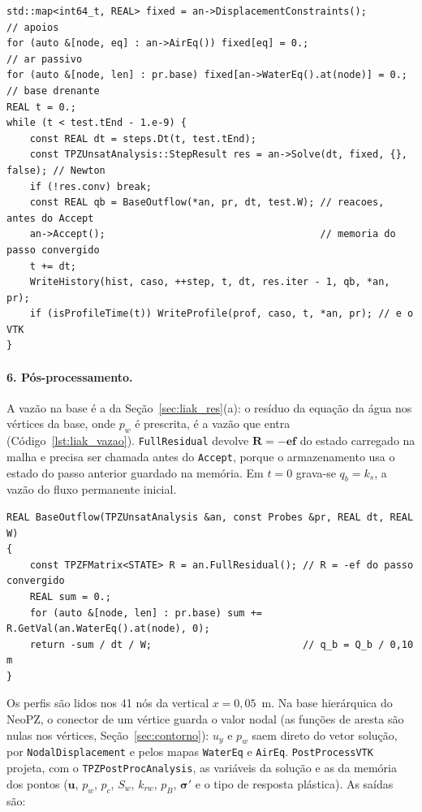 \documentclass[11pt,a4paper]{article}
\newcommand{\vu}{\bm u}
\newcommand{\tsig}{\bm\sigma}
\begin{document}
\begin{lstlisting}[style=neopz,caption={Contorno do transiente e laço no tempo (\texttt{RunCase}, simplificado).},
                   label={lst:liak_passo}]
std::map<int64_t, REAL> fixed = an->DisplacementConstraints();       // apoios
for (auto &[node, eq] : an->AirEq()) fixed[eq] = 0.;                   // ar passivo
for (auto &[node, len] : pr.base) fixed[an->WaterEq().at(node)] = 0.;  // base drenante
REAL t = 0.;
while (t < test.tEnd - 1.e-9) {
    const REAL dt = steps.Dt(t, test.tEnd);
    const TPZUnsatAnalysis::StepResult res = an->Solve(dt, fixed, {}, false); // Newton
    if (!res.conv) break;
    const REAL qb = BaseOutflow(*an, pr, dt, test.W); // reacoes, antes do Accept
    an->Accept();                                     // memoria do passo convergido
    t += dt;
    WriteHistory(hist, caso, ++step, t, dt, res.iter - 1, qb, *an, pr);
    if (isProfileTime(t)) WriteProfile(prof, caso, t, *an, pr); // e o VTK
}
\end{lstlisting}

\paragraph{6. Pós-processamento.} A vazão na base é a da Seção~\ref{sec:liak_res}(a): o resíduo
da equação da água nos vértices da base, onde $p_w$ é prescrita, é a vazão que entra
(Código~\ref{lst:liak_vazao}). \texttt{FullResidual} devolve $\mathbf R=-\mathbf{ef}$ do estado
carregado na malha e precisa ser chamada antes do \texttt{Accept}, porque o armazenamento usa o
estado do passo anterior guardado na memória. Em $t=0$ grava-se $q_b=k_s$, a vazão do fluxo
permanente inicial.

\begin{lstlisting}[style=neopz,caption={Vazão na base pelas reações (\texttt{BaseOutflow}).},
                   label={lst:liak_vazao}]
REAL BaseOutflow(TPZUnsatAnalysis &an, const Probes &pr, REAL dt, REAL W)
{
    const TPZFMatrix<STATE> R = an.FullResidual(); // R = -ef do passo convergido
    REAL sum = 0.;
    for (auto &[node, len] : pr.base) sum += R.GetVal(an.WaterEq().at(node), 0);
    return -sum / dt / W;                          // q_b = Q_b / 0,10 m
}
\end{lstlisting}

Os perfis são lidos nos 41 nós da vertical $x=0{,}05$~m. Na base hierárquica do NeoPZ, o conector
de um vértice guarda o valor nodal (as funções de aresta são nulas nos vértices,
Seção~\ref{sec:contorno}): $u_y$ e $p_w$ saem direto do vetor solução, por
\texttt{NodalDisplacement} e pelos mapas \texttt{WaterEq} e \texttt{AirEq}. \texttt{PostProcessVTK}
projeta, com o \texttt{TPZPostProcAnalysis}, as variáveis da solução e as da memória dos pontos
($\vu$, $p_w$, $p_c$, $S_w$, $k_{rw}$, $p_B$, $\tsig'$ e o tipo de resposta plástica). As saídas são:
\end{document}

